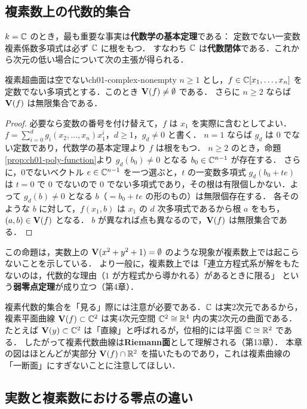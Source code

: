 \subsection{複素数上の代数的集合}

$k=\mathbb{C}$ のとき，最も重要な事実は\textbf{代数学の基本定理}である：
定数でない一変数複素係数多項式は必ず $\mathbb{C}$ に根をもつ．
すなわち $\mathbb{C}$ は\textbf{代数閉体}である．これから次元の低い場合について次の主張が得られる．

\begin{myprop}{複素超曲面は空でない}{ch01-complex-nonempty}
$n\ge1$ とし，$f\in\mathbb{C}[x_1,\dots,x_n]$ を定数でない多項式とする．このとき $\mathbf{V}(f)\ne\emptyset$ である．
さらに $n\ge2$ ならば $\mathbf{V}(f)$ は無限集合である．
\end{myprop}

\begin{proof}
必要なら変数の番号を付け替えて，$f$ は $x_1$ を実際に含むとしてよい．
$f=\sum_{i=0}^dg_i(x_2,\dots,x_n)x_1^i$，$d\ge1$，$g_d\ne0$ と書く．
$n=1$ ならば $g_d$ は $0$ でない定数であり，代数学の基本定理より $f$ は根をもつ．
$n\ge2$ のとき，命題\ref{prop:ch01-poly-function}より $g_d(b_0)\ne0$ となる $b_0\in\mathbb{C}^{n-1}$ が存在する．
さらに，0でないベクトル $e\in\mathbb{C}^{n-1}$ を一つ選ぶと，$t$ の一変数多項式 $g_d(b_0+te)$ は $t=0$ で $0$ でないので
$0$ でない多項式であり，その根は有限個しかない．よって $g_d(b)\ne0$ となる $b$（$=b_0+te$ の形のもの）は無限個存在する．
各そのような $b$ に対して，$f(x_1,b)$ は $x_1$ の $d$ 次多項式であるから根 $a$ をもち，$(a,b)\in\mathbf{V}(f)$ となる．
$b$ が異なれば点も異なるので，$\mathbf{V}(f)$ は無限集合である．
\end{proof}

この命題は，実数上の $\mathbf{V}(x^2+y^2+1)=\emptyset$ のような現象が複素数上では起こらないことを示している．
より一般に，複素数上では「連立方程式系が解をもたないのは，代数的な理由（$1$ が方程式から導かれる）があるときに限る」
という\textbf{弱零点定理}が成り立つ（第4章）．

複素代数的集合を「見る」際には注意が必要である．$\mathbb{C}$ は実2次元であるから，
複素平面曲線 $\mathbf{V}(f)\subset\mathbb{C}^2$ は実4次元空間 $\mathbb{C}^2\cong\mathbb{R}^4$ 内の実2次元の曲面である．
たとえば $\mathbf{V}(y)\subset\mathbb{C}^2$ は「直線」と呼ばれるが，位相的には平面 $\mathbb{C}\cong\mathbb{R}^2$ である．
したがって複素代数曲線は\textbf{Riemann面}として理解される（第13章）．
本章の図はほとんどが実部分 $\mathbf{V}(f)\cap\mathbb{R}^2$ を描いたものであり，これは複素曲線の「一断面」にすぎないことに注意してほしい．

\subsection{実数と複素数における零点の違い}

